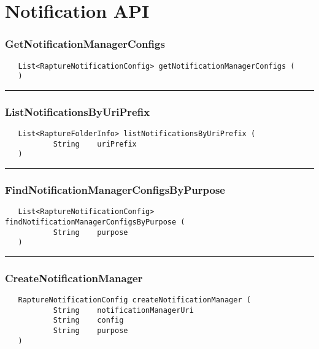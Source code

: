 \chapter{Notification API}

\subsection{GetNotificationManagerConfigs}
\label{Api:GetNotificationManagerConfigs}
\begin{verbatim}
   List<RaptureNotificationConfig> getNotificationManagerConfigs (
   )
\end{verbatim}



\rule{15cm}{2pt}
\subsection{ListNotificationsByUriPrefix}
\label{Api:ListNotificationsByUriPrefix}
\begin{verbatim}
   List<RaptureFolderInfo> listNotificationsByUriPrefix (
           String    uriPrefix
   )
\end{verbatim}



\rule{15cm}{2pt}
\subsection{FindNotificationManagerConfigsByPurpose}
\label{Api:FindNotificationManagerConfigsByPurpose}
\begin{verbatim}
   List<RaptureNotificationConfig> findNotificationManagerConfigsByPurpose (
           String    purpose
   )
\end{verbatim}



\rule{15cm}{2pt}
\subsection{CreateNotificationManager}
\label{Api:CreateNotificationManager}
\begin{verbatim}
   RaptureNotificationConfig createNotificationManager (
           String    notificationManagerUri
           String    config
           String    purpose
   )
\end{verbatim}



